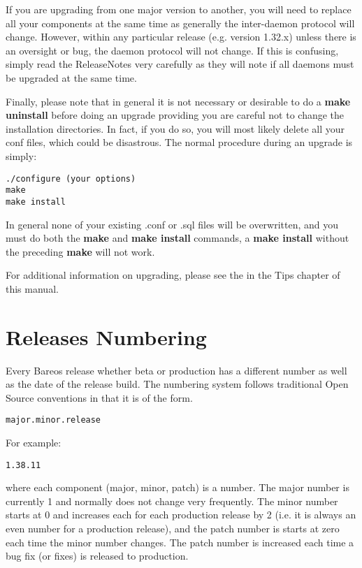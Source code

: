 If you are upgrading from one major version to another, you will need to
replace all your components at the same time as generally the inter-daemon
protocol will change. However, within any particular release (e.g. version
1.32.x) unless there is an oversight or bug, the daemon protocol will not
change. If this is confusing, simply read the ReleaseNotes very carefully as
they will note if all daemons must be upgraded at the same time.

Finally, please note that in general it is not necessary or desirable
to do a {\bf make uninstall} before doing an upgrade providing you are careful
not to change the installation directories. In fact, if you do so, you will
most likely delete all your conf files, which could be disastrous.
The normal procedure during an upgrade is simply:

\begin{verbatim}
./configure (your options)
make
make install
\end{verbatim}

In general none of your existing .conf or .sql files will be overwritten,
and you must do both the {\bf make} and {\bf make install}  commands, a
{\bf make install} without the preceding {\bf make} will not work.

For additional information on upgrading, please see the  in the Tips chapter of this manual.

\section{Releases Numbering}
Every Bareos release whether beta or production has a different number
as well as the date of the release build. The numbering system follows
traditional Open Source conventions in that it is of the form.

\begin{verbatim}
major.minor.release
\end{verbatim}

For example:
\begin{verbatim}
1.38.11
\end{verbatim}

where each component (major, minor, patch) is a number.
The major number is currently 1 and normally does not change
very frequently.  The minor number starts at 0 and increases
each for each production release by 2 (i.e. it is always an
even number for a production release), and the patch number is
starts at zero each time the minor number changes.  The patch
number is increased each time a bug fix (or fixes) is released
to production.

